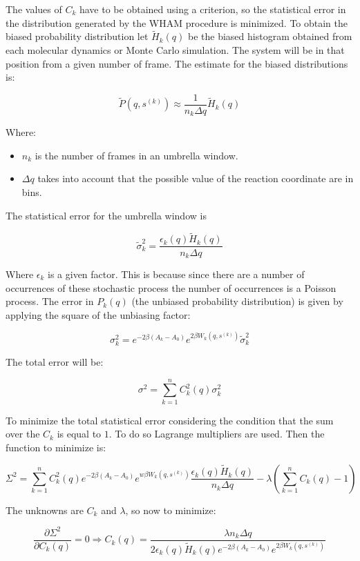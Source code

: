 	The values of $C_k$ have to be obtained using a criterion, so the statistical error in the distribution generated by the WHAM procedure is minimized.
	To obtain the biased probability distribution let $\tilde{H}_k(q)$ be the biased histogram obtained from each molecular dynamics or Monte Carlo simulation.
	The system will be in that position from a given number of frame.
	The estimate for the biased distributions is:

	$$\tilde{P}(q, s^{(k)}) \approx\frac{1}{n_k\Delta q}\tilde{H}_k(q)$$

	Where:

	\begin{multicols}{2}
		\begin{itemize}
			\item $n_k$ is the number of frames in an umbrella window.
			\item $\Delta q$ takes into account that the possible value of the reaction coordinate are in bins.
		\end{itemize}
	\end{multicols}

	The statistical error for the umbrella window is

	$$\tilde{\sigma}^2_k = \frac{\epsilon_k(q)\tilde{H}_k(q)}{n_k\Delta q}$$

	Where $\epsilon_k$ is a given factor.
	This is because since there are a number of occurrences of these stochastic process the number of occurrences is a Poisson process.
	The error in $P_k(q)$ (the unbiased probability distribution) is given by applying the square of the unbiasing  factor:

	$$\sigma_k^2 = e^{-2\beta(A_k-A_0)}e^{2\beta W_k(q, s^{(k)})}\tilde{\sigma}_k^2$$

	The total error will be:

	$$\sigma^2 = \sum\limits_{k=1}^nC_k^2(q)\sigma_k^2$$

	To minimize the total statistical error considering the condition that the sum over the $C_k$ is equal to $1$.
	To do so Lagrange multipliers are used.
	Then the function to minimize is:

	$$\Sigma^2=\sum\limits_{k=1}^nC_k^2(q)e^{-2\beta (A_k-A_0)}e^{w\beta W_k(q, s^{(k)})}\frac{\epsilon_k(q)\tilde{H}_k(q)}{n_k\Delta q}-\lambda\left(\sum\limits_{k=1}^nC_k(q)-1\right)$$

	The unknowns are $C_k$ and $\lambda$, so now to minimize:

	$$\frac{\partial\Sigma^2}{\partial C_k(q)} = 0\Rightarrow C_k(q) = \frac{\lambda n_k\Delta q}{2\epsilon_k(q)\tilde{H}_k(q)e^{-2\beta(A_k-A_0)}e^{2\beta W_k(q, s^{(k)})}}$$

